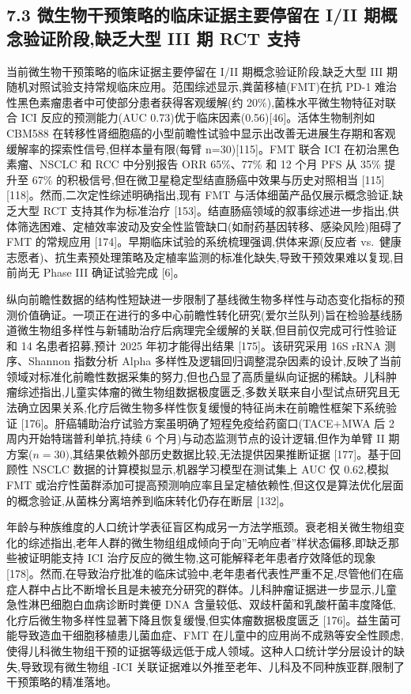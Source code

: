 \documentclass[11pt]{article}
\begin{document}
\subsection{7.3 微生物干预策略的临床证据主要停留在 I/II 期概念验证阶段,缺乏大型 III 期 RCT 支持}\label{ux5faeux751fux7269ux5e72ux9884ux7b56ux7565ux7684ux4e34ux5e8aux8bc1ux636eux4e3bux8981ux505cux7559ux5728-iii-ux671fux6982ux5ff5ux9a8cux8bc1ux9636ux6bb5ux7f3aux4e4fux5927ux578b-iii-ux671f-rct-ux652fux6301}

当前微生物干预策略的临床证据主要停留在 I/II 期概念验证阶段,缺乏大型 III 期随机对照试验支持常规临床应用。范围综述显示,粪菌移植(FMT)在抗 PD-1 难治性黑色素瘤患者中可使部分患者获得客观缓解(约 20\%),菌株水平微生物特征对联合 ICI 反应的预测能力(AUC 0.73)优于临床因素(0.56){[}46{]}。活体生物制剂如 CBM588 在转移性肾细胞癌的小型前瞻性试验中显示出改善无进展生存期和客观缓解率的探索性信号,但样本量有限(每臂 n=30){[}115{]}。FMT 联合 ICI 在初治黑色素瘤、NSCLC 和 RCC 中分别报告 ORR 65\%、77\% 和 12 个月 PFS 从 35\% 提升至 67\% 的积极信号,但在微卫星稳定型结直肠癌中效果与历史对照相当 {[}115{]}{[}118{]}。然而,二次定性综述明确指出,现有 FMT 与活体细菌产品仅展示概念验证,缺乏大型 RCT 支持其作为标准治疗 {[}153{]}。结直肠癌领域的叙事综述进一步指出,供体筛选困难、定植效率波动及安全性监管缺口(如耐药基因转移、感染风险)阻碍了 FMT 的常规应用 {[}174{]}。早期临床试验的系统梳理强调,供体来源(反应者 vs.~健康志愿者)、抗生素预处理策略及定植率监测的标准化缺失,导致干预效果难以复现,目前尚无 Phase III 确证试验完成 {[}6{]}。

纵向前瞻性数据的结构性短缺进一步限制了基线微生物多样性与动态变化指标的预测价值确证。一项正在进行的多中心前瞻性转化研究(爱尔兰队列)旨在检验基线肠道微生物组多样性与新辅助治疗后病理完全缓解的关联,但目前仅完成可行性验证和 14 名患者招募,预计 2025 年初才能得出结果 {[}175{]}。该研究采用 16S rRNA 测序、Shannon 指数分析 Alpha 多样性及逻辑回归调整混杂因素的设计,反映了当前领域对标准化前瞻性数据采集的努力,但也凸显了高质量纵向证据的稀缺。儿科肿瘤综述指出,儿童实体瘤的微生物组数据极度匮乏,多数关联来自小型试点研究且无法确立因果关系,化疗后微生物多样性恢复缓慢的特征尚未在前瞻性框架下系统验证 {[}176{]}。肝癌辅助治疗试验方案虽明确了短程免疫给药窗口(TACE+MWA 后 2 周内开始特瑞普利单抗,持续 6 个月)与动态监测节点的设计逻辑,但作为单臂 II 期方案(\(n=30)\),其结果依赖外部历史数据比较,无法提供因果推断证据 {[}177{]}。基于回顾性 NSCLC 数据的计算模拟显示,机器学习模型在测试集上 AUC 仅 0.62,模拟 FMT 或治疗性菌群添加可提高预测响应率且呈定植依赖性,但这仅是算法优化层面的概念验证,从菌株分离培养到临床转化仍存在断层 {[}132{]}。

年龄与种族维度的人口统计学表征盲区构成另一方法学瓶颈。衰老相关微生物组变化的综述指出,老年人群的微生物组组成倾向于向''无响应者''样状态偏移,即缺乏那些被证明能支持 ICI 治疗反应的微生物,这可能解释老年患者疗效降低的现象 {[}178{]}。然而,在导致治疗批准的临床试验中,老年患者代表性严重不足,尽管他们在癌症人群中占比不断增长且是未被充分研究的群体。儿科肿瘤证据进一步显示,儿童急性淋巴细胞白血病诊断时粪便 DNA 含量较低、双歧杆菌和乳酸杆菌丰度降低,化疗后微生物多样性显著下降且恢复缓慢,但实体瘤数据极度匮乏 {[}176{]}。益生菌可能导致造血干细胞移植患儿菌血症、FMT 在儿童中的应用尚不成熟等安全性顾虑,使得儿科微生物组干预的证据等级远低于成人领域。这种人口统计学分层设计的缺失,导致现有微生物组 -ICI 关联证据难以外推至老年、儿科及不同种族亚群,限制了干预策略的精准落地。
\end{document}
